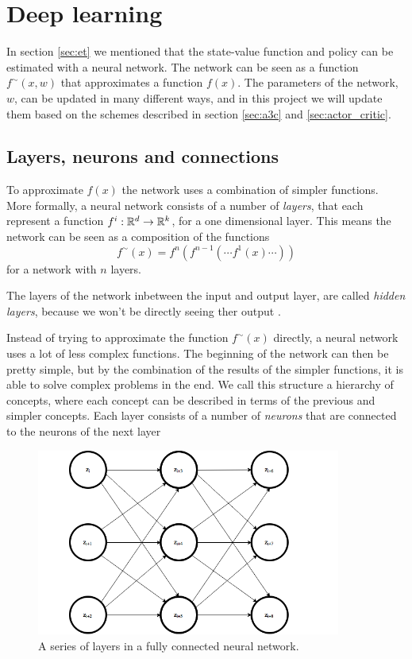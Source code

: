 \documentclass[11pt]{article}
\begin{document}
\maketitle

\section{Deep learning}\label{sec:deep_learning}

In section \ref{sec:et} we mentioned that the state-value function and policy
can be estimated with a neural network.
The network can be seen as a function $f^\sim(x, w)$ that approximates a
function $f(x)$.
The parameters of the network, $w$, can be updated in many different ways, and in
this project we will update them based on the schemes described in section \ref{sec:a3c}
and \ref{sec:actor_critic}.

\subsection{Layers, neurons and connections}\label{sec:lnc}

To approximate $f(x)$ the network uses a combination of simpler functions.
More formally, a neural network consists of a number of \textit{layers},
that each represent a function $f^i : \mathbb{R}^{d} \to \mathbb{R}^k$, for a one dimensional layer.
This means the network can be seen as a composition of the functions
\begin{equation}
    f^\sim(x) = f^n(f^{n-1}( \cdots f^1(x) \cdots))
\end{equation}
for a network with $n$ layers.

The layers of the network inbetween the input and output layer, are called
\textit{hidden layers}, because we won't be directly seeing ther output
\cite{DeepLearningBook}.

Instead of trying to approximate the function $f^\sim(x)$ directly,
a neural network uses a lot of less complex functions.
The beginning of the network can then be pretty simple, but by the combination of the results of
the simpler functions, it is able to solve complex problems in the end.
We call this structure a hierarchy of concepts, where each concept can be described in terms
of the previous and simpler concepts\cite{DeepLearningBook}.
Each layer consists of a number of \textit{neurons} that are connected to the
neurons of the next layer
\begin{figure}[!h]
    \centering
    \includegraphics[width=10cm]{include/layers.png}
    \caption{A series of layers in a fully connected neural network.}
    \label{fig:layers}
\end{figure}
\end{document}
